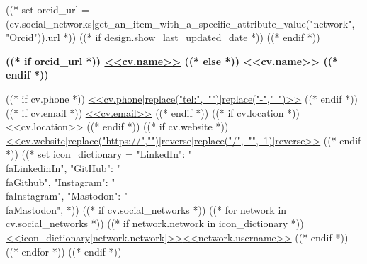 ((* set orcid_url = (cv.social_networks|get_an_item_with_a_specific_attribute_value("network", "Orcid")).url *))
((* if design.show_last_updated_date *))
\placelastupdatedtext
((* endif *))

{
    \centering
    \textbf{\fontsize{<<design.header_font_size>>}{<<design.header_font_size>>}\selectfont
        ((* if orcid_url *))
        \href{<<orcid_url>>}{<<cv.name>>}
        ((* else *))
        <<cv.name>>
        ((* endif *))
    } \\ \vspace{3pt}
    \small

    \vspace{<<design.margins.header.vertical_between_name_and_connections>>}
    
    \begin{spacing}{1.6}
    ((* if cv.phone *))
    \mbox{\href{<<cv.phone|replace("-","")>>}{{\footnotesize\faPhone*}\hspace{4pt}<<cv.phone|replace("tel:", "")|replace("-"," ")>>}}
    \hspace{<<design.margins.header.horizontal_between_connections>>}
    ((* endif *))
    ((* if cv.email *))
    \mbox{\href{mailto:<<cv.email>>}{{\small\faEnvelope[regular]}\hspace{4pt}<<cv.email>>}}
    \hspace{<<design.margins.header.horizontal_between_connections>>}
    ((* endif *))
    ((* if cv.location *))
    \mbox{{\small\faMapMarker*}\hspace{4pt}<<cv.location>>}
    \hspace{<<design.margins.header.horizontal_between_connections>>}
    ((* endif *))
    ((* if cv.website *))
    \mbox{\href{<<cv.website>>}{{\small\faLink}\hspace{4pt}<<cv.website|replace("https://","")|reverse|replace("/", "", 1)|reverse>>}}
    \hspace{<<design.margins.header.horizontal_between_connections>>}
    ((* endif *))
    ((*
        set icon_dictionary = {
            "LinkedIn": "\\faLinkedinIn",
            "GitHub": "\\faGithub",
            "Instagram": "\\faInstagram",
            "Mastodon": "\\faMastodon",
        }
    *))
    ((* if cv.social_networks *))
        ((* for network in cv.social_networks *))
            ((* if network.network in icon_dictionary *))
    \mbox{\href{<<network.url>>}{{\small<<icon_dictionary[network.network]>>}\hspace{4pt}<<network.username>>}}
    \hspace*{<<design.margins.header.horizontal_between_connections>>}
            ((* endif *))
        ((* endfor *))
    ((* endif *))
    \end{spacing}
    \par
}

